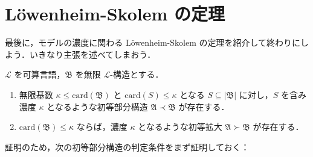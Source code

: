 \documentclass[a4j]{jsarticle}
\newcommand{\card}{\mathrm{card}}
\begin{document}
\section{L\"{o}wenheim-Skolem の定理}
最後に，モデルの濃度に関わる L\"{o}wenheim-Skolem の定理を紹介して終わりにしよう．いきなり主張を述べてしまおう．

\begin{theorem}
 $\mathcal{L}$ を可算言語，$\mathfrak{B}$ を無限 $\mathcal{L}$-構造とする．
 \begin{enumerate}[label=(\alph{*})]
  \item 無限基数 $\kappa \leq \card(\mathfrak{B})$ と $\card(S) \leq \kappa$ となる $S \subseteq |\mathfrak{B}|$ に対し，$S$ を含み濃度 $\kappa$ となるような初等部分構造 $\mathfrak{A} \prec \mathfrak{B}$ が存在する．
  \item $\card(\mathfrak{B}) \leq \kappa$ ならば，濃度 $\kappa$ となるような初等拡大 $\mathfrak{A} \succ \mathfrak{B}$ が存在する．
 \end{enumerate}
\end{theorem}

証明のため，次の初等部分構造の判定条件をまず証明しておく：
\end{document}
